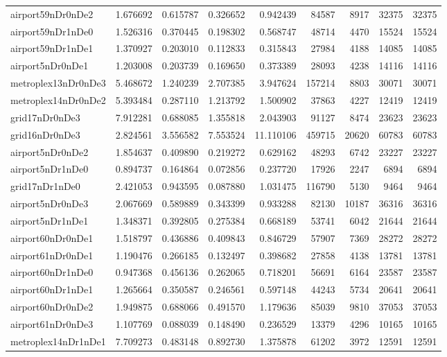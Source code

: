 \documentclass[../../../thesis.tex]{subfiles}
\begin{document}
\begin{longtable}{|l|r|r|r|r|r|r|r|r|}
airport59nDr0nDe2 & 1.676692 & 0.615787 & 0.326652 & 0.942439 & 84587 & 8917 & 32375 & 32375 \\
airport59nDr1nDe0 & 1.526316 & 0.370445 & 0.198302 & 0.568747 & 48714 & 4470 & 15524 & 15524 \\
airport59nDr1nDe1 & 1.370927 & 0.203010 & 0.112833 & 0.315843 & 27984 & 4188 & 14085 & 14085 \\
airport5nDr0nDe1 & 1.203008 & 0.203739 & 0.169650 & 0.373389 & 28093 & 4238 & 14116 & 14116 \\
metroplex13nDr0nDe3 & 5.468672 & 1.240239 & 2.707385 & 3.947624 & 157214 & 8803 & 30071 & 30071 \\
metroplex14nDr0nDe2 & 5.393484 & 0.287110 & 1.213792 & 1.500902 & 37863 & 4227 & 12419 & 12419 \\
grid17nDr0nDe3 & 7.912281 & 0.688085 & 1.355818 & 2.043903 & 91127 & 8474 & 23623 & 23623 \\
grid16nDr0nDe3 & 2.824561 & 3.556582 & 7.553524 & 11.110106 & 459715 & 20620 & 60783 & 60783 \\
airport5nDr0nDe2 & 1.854637 & 0.409890 & 0.219272 & 0.629162 & 48293 & 6742 & 23227 & 23227 \\
airport5nDr1nDe0 & 0.894737 & 0.164864 & 0.072856 & 0.237720 & 17926 & 2247 & 6894 & 6894 \\
grid17nDr1nDe0 & 2.421053 & 0.943595 & 0.087880 & 1.031475 & 116790 & 5130 & 9464 & 9464 \\
airport5nDr0nDe3 & 2.067669 & 0.589889 & 0.343399 & 0.933288 & 82130 & 10187 & 36316 & 36316 \\
airport5nDr1nDe1 & 1.348371 & 0.392805 & 0.275384 & 0.668189 & 53741 & 6042 & 21644 & 21644 \\
airport60nDr0nDe1 & 1.518797 & 0.436886 & 0.409843 & 0.846729 & 57907 & 7369 & 28272 & 28272 \\
airport61nDr0nDe1 & 1.190476 & 0.266185 & 0.132497 & 0.398682 & 27858 & 4138 & 13781 & 13781 \\
airport60nDr1nDe0 & 0.947368 & 0.456136 & 0.262065 & 0.718201 & 56691 & 6164 & 23587 & 23587 \\
airport60nDr1nDe1 & 1.265664 & 0.350587 & 0.246561 & 0.597148 & 44243 & 5734 & 20641 & 20641 \\
airport60nDr0nDe2 & 1.949875 & 0.688066 & 0.491570 & 1.179636 & 85039 & 9810 & 37053 & 37053 \\
airport61nDr0nDe3 & 1.107769 & 0.088039 & 0.148490 & 0.236529 & 13379 & 4296 & 10165 & 10165 \\
metroplex14nDr1nDe1 & 7.709273 & 0.483148 & 0.892730 & 1.375878 & 61202 & 3972 & 12591 & 12591 \\

\end{longtable}
\end{document}
